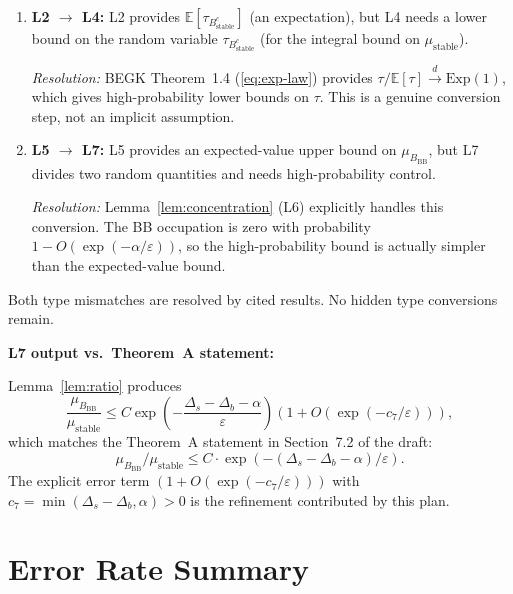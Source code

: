 \documentclass[11pt]{article}
\newcommand{\eps}{\varepsilon}
\newcommand{\Ds}{\Delta_s}
\newcommand{\Db}{\Delta_b}
\newcommand{\Bstable}{B_{\mathrm{stable}}}
\newcommand{\BBB}{B_{\mathrm{BB}}}
\begin{document}
\begin{enumerate}
\item \textbf{L2 $\to$ L4:} L2 provides $\mathbb{E}[\tau_{\Bstable^c}]$
  (an expectation), but L4 needs a lower bound on the random variable
  $\tau_{\Bstable^c}$ (for the integral bound on $\mu_{\mathrm{stable}}$).

  \emph{Resolution:} BEGK Theorem~1.4 (\eqref{eq:exp-law}) provides
  $\tau / \mathbb{E}[\tau] \xrightarrow{d} \mathrm{Exp}(1)$, which gives
  high-probability lower bounds on $\tau$. This is a genuine
  conversion step, not an implicit assumption.

\item \textbf{L5 $\to$ L7:} L5 provides an expected-value upper bound
  on $\mu_{\BBB}$, but L7 divides two random quantities and needs
  high-probability control.

  \emph{Resolution:} Lemma~\ref{lem:concentration} (L6) explicitly
  handles this conversion. The BB occupation is zero with probability
  $1 - O(\exp(-\alpha/\eps))$, so the high-probability bound is
  actually simpler than the expected-value bound.
\end{enumerate}

Both type mismatches are resolved by cited results. No hidden
type conversions remain.

\medskip
\noindent
\textbf{L7 output vs.\ Theorem~A statement:}

Lemma~\ref{lem:ratio} produces
\[
  \frac{\mu_{\BBB}}{\mu_{\mathrm{stable}}}
  \leq C \exp\!\left(-\frac{\Ds - \Db - \alpha}{\eps}\right)
  (1 + O(\exp(-c_7/\eps))),
\]
which matches the Theorem~A statement in Section~7.2 of the draft:
\[
  \mu_{\BBB} / \mu_{\mathrm{stable}}
  \leq C \cdot \exp(-(\Ds - \Db - \alpha)/\eps).
\]
The explicit error term $(1 + O(\exp(-c_7/\eps)))$ with
$c_7 = \min(\Ds - \Db, \alpha) > 0$ is the refinement
contributed by this plan.

\section{Error Rate Summary}
\label{sec:error-summary}
\end{document}
